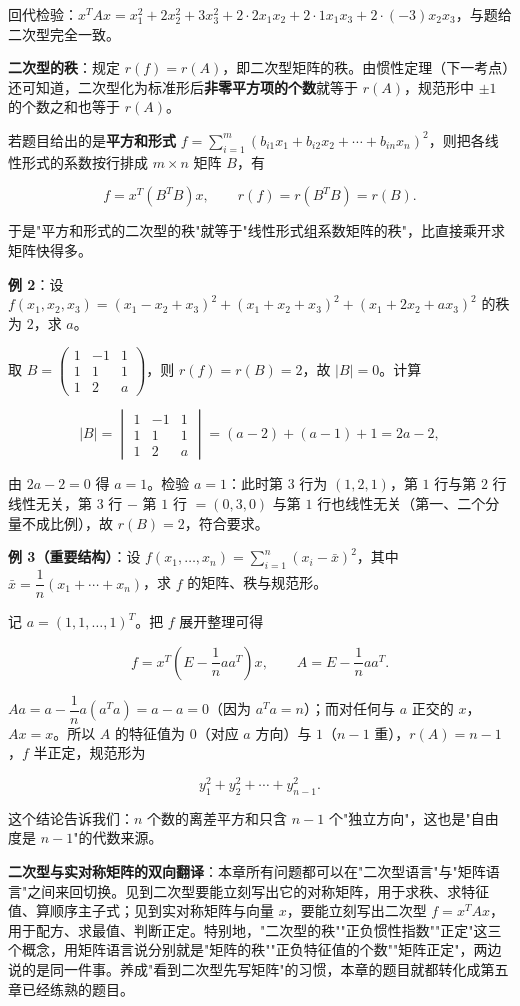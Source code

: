 \documentclass[11pt,openany,UTF8]{ctexbook}
\begin{document}
回代检验：$x^TAx=x_1^2+2x_2^2+3x_3^2+2\cdot2x_1x_2+2\cdot1x_1x_3+2\cdot(-3)x_2x_3$，与题给二次型完全一致。

\textbf{二次型的秩}：规定 $r(f)=r(A)$，即二次型矩阵的秩。由惯性定理（下一考点）还可知道，二次型化为标准形后\textbf{非零平方项的个数}就等于 $r(A)$，规范形中 $\pm1$ 的个数之和也等于 $r(A)$。

若题目给出的是\textbf{平方和形式} $f=\sum\limits_{i=1}^{m}(b_{i1}x_1+b_{i2}x_2+\cdots+b_{in}x_n)^2$，则把各线性形式的系数按行排成 $m\times n$ 矩阵 $B$，有

\[f=x^T(B^TB)x,\qquad r(f)=r(B^TB)=r(B).\]

于是"平方和形式的二次型的秩"就等于"线性形式组系数矩阵的秩"，比直接乘开求矩阵快得多。

\textbf{例 2}：设 $f(x_1,x_2,x_3)=(x_1-x_2+x_3)^2+(x_1+x_2+x_3)^2+(x_1+2x_2+ax_3)^2$ 的秩为 $2$，求 $a$。

取 $B=\begin{pmatrix}1&-1&1\\1&1&1\\1&2&a\end{pmatrix}$，则 $r(f)=r(B)=2$，故 $\vert B\vert=0$。计算

\[\vert B\vert=\begin{vmatrix}1&-1&1\\1&1&1\\1&2&a\end{vmatrix}=(a-2)+(a-1)+1=2a-2,\]

由 $2a-2=0$ 得 $a=1$。检验 $a=1$：此时第 $3$ 行为 $(1,2,1)$，第 $1$ 行与第 $2$ 行线性无关，第 $3$ 行 $-$ 第 $1$ 行 $=(0,3,0)$ 与第 $1$ 行也线性无关（第一、二个分量不成比例），故 $r(B)=2$，符合要求。

\textbf{例 3（重要结构）}：设 $f(x_1,\dots,x_n)=\sum\limits_{i=1}^{n}(x_i-\bar x)^2$，其中 $\bar x=\dfrac{1}{n}(x_1+\cdots+x_n)$，求 $f$ 的矩阵、秩与规范形。

记 $a=(1,1,\dots,1)^T$。把 $f$ 展开整理可得

\[f=x^T\left(E-\frac1naa^T\right)x,\qquad A=E-\frac1naa^T .\]

$Aa=a-\dfrac1na(a^Ta)=a-a=0$（因为 $a^Ta=n$）；而对任何与 $a$ 正交的 $x$，$Ax=x$。所以 $A$ 的特征值为 $0$（对应 $a$ 方向）与 $1$（$n-1$ 重），$r(A)=n-1$，$f$ 半正定，规范形为

\[y_1^2+y_2^2+\cdots+y_{n-1}^2 .\]

这个结论告诉我们：$n$ 个数的离差平方和只含 $n-1$ 个"独立方向"，这也是"自由度是 $n-1$"的代数来源。

\textbf{二次型与实对称矩阵的双向翻译}：本章所有问题都可以在"二次型语言"与"矩阵语言"之间来回切换。见到二次型要能立刻写出它的对称矩阵，用于求秩、求特征值、算顺序主子式；见到实对称矩阵与向量 $x$，要能立刻写出二次型 $f=x^TAx$，用于配方、求最值、判断正定。特别地，"二次型的秩""正负惯性指数""正定"这三个概念，用矩阵语言说分别就是"矩阵的秩""正负特征值的个数""矩阵正定"，两边说的是同一件事。养成"看到二次型先写矩阵"的习惯，本章的题目就都转化成第五章已经练熟的题目。
\end{document}

